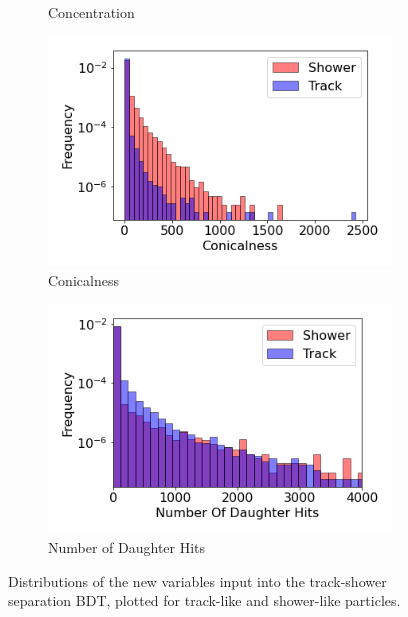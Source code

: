 \begin{figure}[htbp!]
\begin{subfigure}[b]{0.45\textwidth}
            \caption{Concentration}%
            \label{fig:feature_concentration}
        \end{subfigure}
        \hfill
        \begin{subfigure}[b]{0.45\textwidth}  
            \centering 
            \includegraphics[width=\textwidth]{Feature_Conicalness}
            \caption{Conicalness}%
            \label{fig:feature_conicalness}
        \end{subfigure}
        \hfill
        \begin{subfigure}[b]{0.45\textwidth}  
            \centering 
            \includegraphics[width=\textwidth]{Feature_Number_Of_Daughter_Hits}
            \caption{Number of Daughter Hits}%
            \label{fig:feature_nDaughterHits}
        \end{subfigure}
        \caption[bdt_features]{
	Distributions of the new variables input into the track-shower separation BDT, plotted for track-like and shower-like particles.
	}
        \label{fig:bdt_features}
\end{figure}

